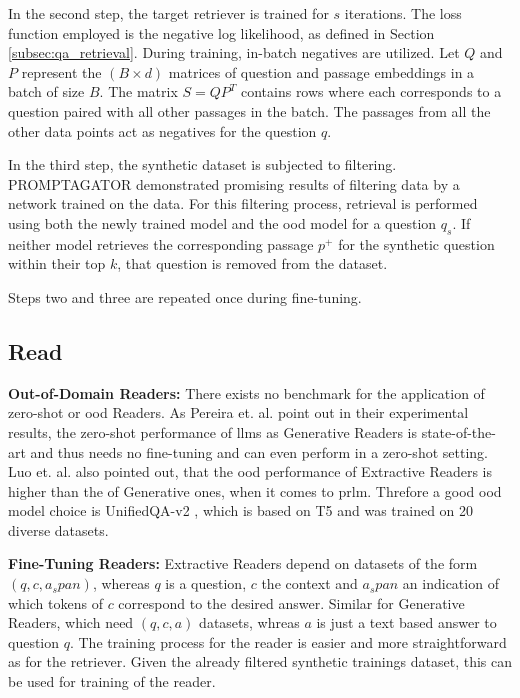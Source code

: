 In the second step, the target retriever is trained for $s$ iterations. The loss function employed is the negative log likelihood, as defined in Section \ref{subsec:qa_retrieval}. During training, in-batch negatives are utilized. Let $Q$ and $P$ represent the $(B \times d)$ matrices of question and passage embeddings in a batch of size $B$. The matrix $S = Q P^{T}$ contains rows where each corresponds to a question paired with all other passages in the batch. The passages from all the other data points act as negatives for the question $q$.

In the third step, the synthetic dataset is subjected to filtering. PROMPTAGATOR demonstrated promising results of filtering data by a network trained on the data. For this filtering process, retrieval is performed using both the newly trained model and the \gls{ood} model for a question $q_s$. If neither model retrieves the corresponding passage $p^{+}$ for the synthetic question within their top $k$, that question is removed from the dataset.

Steps two and three are repeated once during fine-tuning.
\subsection{Read}
\label{subsec:read}

\textbf{Out-of-Domain Readers:} There exists no benchmark for the application of zero-shot or \gls{ood} Readers. As Pereira et. al. \cite{pereira_visconde_2022} point out in their experimental results, the zero-shot performance of \gls{llm}s as Generative Readers is state-of-the-art and thus needs no fine-tuning and can even perform in a zero-shot setting. Luo et. al. \cite{luo_choose_2022} also pointed out, that the \gls{ood} performance of Extractive Readers is higher than the of Generative ones, when it comes to \gls{prlm}. Threfore a good \gls{ood} model choice is UnifiedQA-v2 \cite{khashabi_unifiedqa-v2_2022}, which is based on T5 \cite{raffel_exploring_2023} and was trained on 20 diverse datasets.

\noindent\textbf{Fine-Tuning Readers:} Extractive Readers depend on datasets of the form $(q, c, a_span)$, whereas $q$ is a question, $c$ the context and $a_span$ an indication of which tokens of $c$ correspond to the desired answer. Similar for Generative Readers, which need $(q, c, a)$ datasets, whreas $a$ is just a text based answer to question $q$. The training process for the reader is easier and more straightforward as for the retriever. Given the already filtered synthetic trainings dataset, this can be used for training of the reader.

